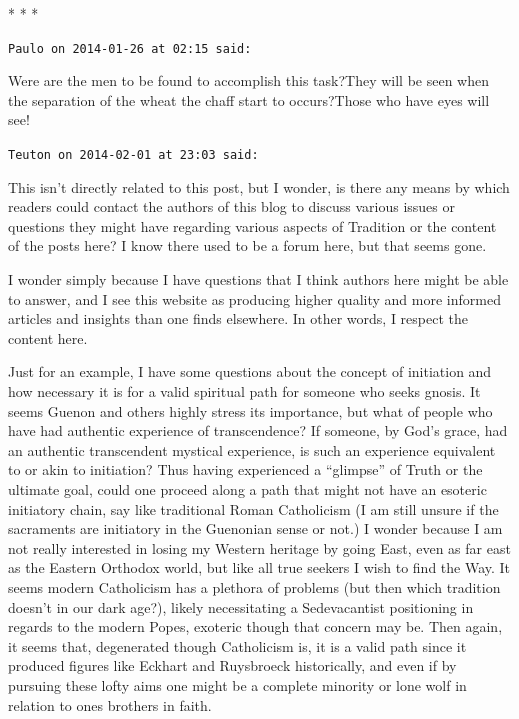 
\begin{center}* * *\end{center}

\begin{footnotesize}
\begin{sffamily}
\texttt{Paulo on 2014-01-26 at 02:15 said:}

Were are the men to be found to accomplish this task?They will be seen when the separation of the wheat the chaff start to occurs?Those who have eyes will see!

\hfill

\texttt{Teuton on 2014-02-01 at 23:03 said:}

This isn't directly related to this post, but I wonder, is there any means by which readers could contact the authors of this blog to discuss various issues or questions they might have regarding various aspects of Tradition or the content of the posts here? I know there used to be a forum here, but that seems gone.

I wonder simply because I have questions that I think authors here might be able to answer, and I see this website as producing higher quality and more informed articles and insights than one finds elsewhere. In other words, I respect the content here.

Just for an example, I have some questions about the concept of initiation and how necessary it is for a valid spiritual path for someone who seeks gnosis. It seems Guenon and others highly stress its importance, but what of people who have had authentic experience of transcendence? If someone, by God's grace, had an authentic transcendent mystical experience, is such an experience equivalent to or akin to initiation? Thus having experienced a ``glimpse'' of Truth or the ultimate goal, could one proceed along a path that might not have an esoteric initiatory chain, say like traditional Roman Catholicism (I am still unsure if the sacraments are initiatory in the Guenonian sense or not.) I wonder because I am not really interested in losing my Western heritage by going East, even as far east as the Eastern Orthodox world, but like all true seekers I wish to find the Way. It seems modern Catholicism has a plethora of problems (but then which tradition doesn't in our dark age?), likely necessitating a Sedevacantist positioning in regards to the modern Popes, exoteric though that concern may be. Then again, it seems that, degenerated though Catholicism is, it is a valid path since it produced figures like Eckhart and Ruysbroeck historically, and even if by pursuing these lofty aims one might be a complete minority or lone wolf in relation to ones brothers in faith.


\end{sffamily}
\end{footnotesize}
